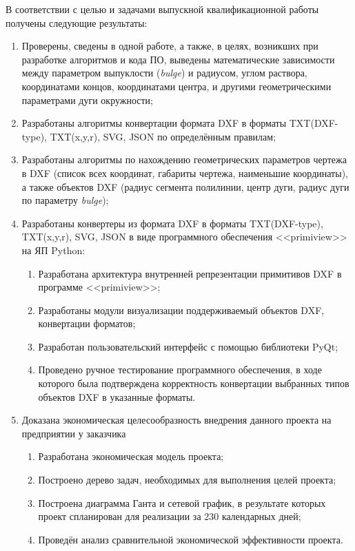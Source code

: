 \Conclusion %

В соответствии с целью и задачами выпускной квалификационной работы получены следующие результаты:

\begin{enumerate}[1)]
	\item Проверены, сведены в одной работе, а также, в целях, возникших при разработке алгоритмов и кода ПО, выведены  математические зависимости между параметром выпуклости (\textit{bulge}) и радиусом, углом раствора, координатами концов, координатами центра, и другими геометрическими параметрами дуги окружности;
	\item Разработаны алгоритмы конвертации формата DXF в форматы TXT(DXF-type), TXT(x,y,r), SVG, JSON по определённым правилам;
	\item Разработаны алгоритмы по нахождению геометрических параметров чертежа в DXF (список всех координат, габариты чертежа, наименьшие координаты), а также объектов DXF (радиус сегмента полилинии, центр дуги, радиус дуги по параметру \textit{bulge});
	\item Разработаны конвертеры из формата DXF в форматы TXT(DXF-type), TXT(x,y,r), SVG, JSON в виде программного обеспечения <<primiview>> на ЯП Python:
	\begin{enumerate}[4.1)]
		\item Разработана архитектура внутренней репрезентации примитивов DXF в программе <<primiview>>;
		\item Разработаны модули визуализации поддерживаемый объектов DXF, конвертации форматов;
		\item Разработан пользовательский интерфейс с помощью библиотеки PyQt;
		\item Проведено ручное тестирование программного обеспечения, в ходе которого была подтверждена корректность конвертации выбранных типов объектов DXF в указанные форматы.
	\end{enumerate}
	\item Доказана экономическая целесообразность внедрения данного проекта на предприятии у заказчика
	\begin{enumerate}[5.1)]
		\item Разработана экономическая модель проекта;
		\item Построено дерево задач, необходимых для выполнения целей проекта;
		\item Построена диаграмма Ганта и сетевой график,  в результате которых проект спланирован для реализации за 230 календарных дней;
		\item Проведён анализ сравнительной экономической эффективности проекта.
	\end{enumerate}
\end{enumerate}

